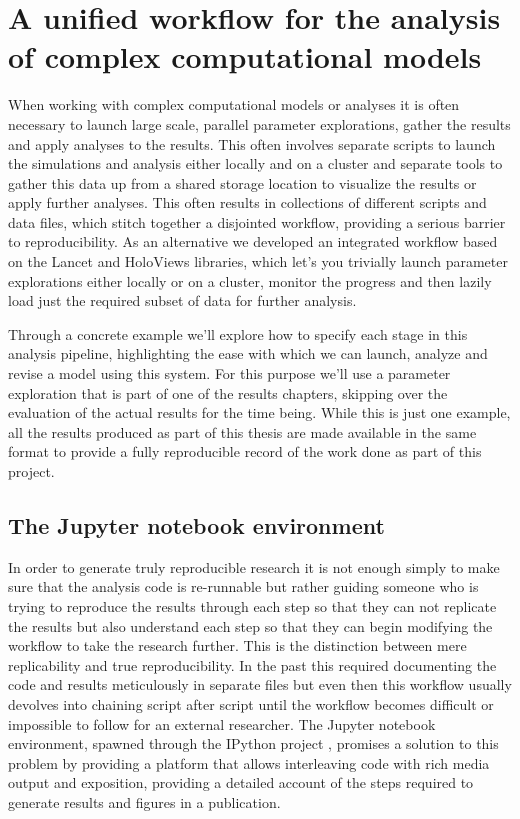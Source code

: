 \section{A unified workflow for the analysis of complex computational models}

When working with complex computational models or analyses it is often
necessary to launch large scale, parallel parameter explorations,
gather the results and apply analyses to the results. This often
involves separate scripts to launch the simulations and analysis
either locally and on a cluster and separate tools to gather this data
up from a shared storage location to visualize the results or apply
further analyses. This often results in collections of different
scripts and data files, which stitch together a disjointed workflow,
providing a serious barrier to reproducibility. As an alternative we
developed an integrated workflow based on the Lancet and HoloViews
libraries, which let's you trivially launch parameter explorations
either locally or on a cluster, monitor the progress and then lazily
load just the required subset of data for further analysis.

Through a concrete example we'll explore how to specify each stage in
this analysis pipeline, highlighting the ease with which we can
launch, analyze and revise a model using this system. For this purpose
we'll use a parameter exploration that is part of one of the results
chapters, skipping over the evaluation of the actual results for the
time being. While this is just one example, all the results produced
as part of this thesis are made available in the same format to
provide a fully reproducible record of the work done as part of this
project.

\subsection{The Jupyter notebook environment}

In order to generate truly reproducible research it is not enough
simply to make sure that the analysis code is re-runnable but rather
guiding someone who is trying to reproduce the results through each
step so that they can not replicate the results but also understand
each step so that they can begin modifying the workflow to take the
research further. This is the distinction between mere replicability
and true reproducibility. In the past this required documenting the
code and results meticulously in separate files but even then this
workflow usually devolves into chaining script after script until the
workflow becomes difficult or impossible to follow for an external
researcher. The Jupyter notebook environment, spawned through the
IPython project \citep{Perez2007}, promises a solution to this problem
by providing a platform that allows interleaving code with rich media
output and exposition, providing a detailed account of the steps
required to generate results and figures in a publication.

